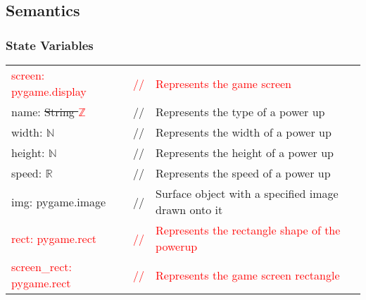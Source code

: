 \documentclass[12pt]{article}
\begin{document}

\subsection* {Semantics}

\subsubsection* {State Variables}
\begin{tabular}{lll}
\textcolor{red}{screen: pygame.display} & \textcolor{red}{//} & \textcolor{red}{Represents the game screen}\\
name: \sout{String \textcolor{red}{$\mathbb{Z}$}} & // & Represents the type of a power up\\
    width: $\mathbb{N}$ & // & Represents the width of a power up\\
    height: $\mathbb{N}$ & // & Represents the height of a power up\\
    speed: $\mathbb{R}$ & // & Represents the speed of a power up\\
    img: pygame.image & // & Surface object with a specified image drawn onto it\\
\textcolor{red}{rect: pygame.rect} & \textcolor{red}{//} & \textcolor{red}{Represents the rectangle shape of the powerup}\\
\textcolor{red}{screen\_rect: pygame.rect} & \textcolor{red}{//} & \textcolor{red}{Represents the game screen rectangle}\\
\end{tabular}
\end{document}
